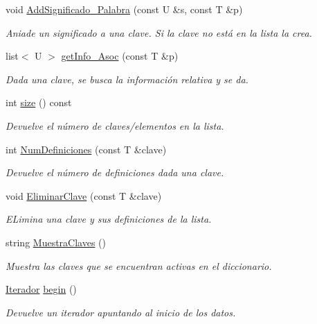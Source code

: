 \begin{DoxyCompactItemize}
void \hyperlink{classDiccionario_a7e167da231bff610001df3c20cc9b7a7}{Add\+Significado\+\_\+\+Palabra} (const U \&s, const T \&p)
\begin{DoxyCompactList}\small\item\em Aniade un significado a una clave. Si la clave no está en la lista la crea. \end{DoxyCompactList}\item 
list$<$ U $>$ \hyperlink{classDiccionario_ad262cd8d8e11286beecfa4851ec2c948}{get\+Info\+\_\+\+Asoc} (const T \&p)
\begin{DoxyCompactList}\small\item\em Dada una clave, se busca la información relativa y se da. \end{DoxyCompactList}\item 
int \hyperlink{classDiccionario_aa576b001759429fd58210ca57257d6f8}{size} () const
\begin{DoxyCompactList}\small\item\em Devuelve el número de claves/elementos en la lista. \end{DoxyCompactList}\item 
int \hyperlink{classDiccionario_a7b54f13ef7e98a6cf3c9e2329d7c5cc7}{Num\+Definiciones} (const T \&clave)
\begin{DoxyCompactList}\small\item\em Devuelve el número de definiciones dada una clave. \end{DoxyCompactList}\item 
void \hyperlink{classDiccionario_ad08c3ef443de483ad26bd2b51121dfb8}{Eliminar\+Clave} (const T \&clave)
\begin{DoxyCompactList}\small\item\em E\+Limina una clave y sus definiciones de la lista. \end{DoxyCompactList}\item 
string \hyperlink{classDiccionario_ae67ff814fff769cfd1b08fc65e161ce3}{Muestra\+Claves} ()
\begin{DoxyCompactList}\small\item\em Muestra las claves que se encuentran activas en el diccionario. \end{DoxyCompactList}\item 
\hyperlink{classDiccionario_1_1Iterador}{Iterador} \hyperlink{classDiccionario_ae584d64109213b785b2db48e9ef62320}{begin} ()
\begin{DoxyCompactList}\small\item\em Devuelve un iterador apuntando al inicio de los datos. \end{DoxyCompactList}\item 

\end{DoxyCompactItemize}
